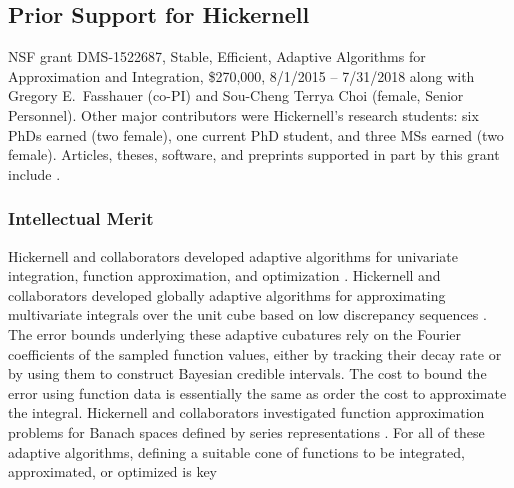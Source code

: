 \documentclass[11pt]{NSFamsart}
\begin{document}
\subsection*{Prior Support for Hickernell} NSF grant DMS-1522687, Stable, Efficient, Adaptive Algorithms for Approximation and Integration,
		\$270,000, 8/1/2015 -- 7/31/2018 along with Gregory E.\ Fasshauer (co-PI) and  Sou-Cheng Terrya Choi (female, Senior Personnel).  Other major contributors were Hickernell's research students: 
		six PhDs earned (two female), one current PhD student, and three MSs earned (two female).
Articles, theses, software, and preprints supported in
part by this grant include
\cite{ala_augmented_2017,
	ChoEtal17a,
	ChoEtal20a,
	Din15a,
	DinHic20a,
	GilEtal16a,
	Hic17a,
	HicJag18b,
	HicJim16a,
	HicEtal18a,
	HicEtal17a,
	HicKriWoz19a,
	RatHic19a,
	GilJim16b,
	JimHic16a,
	JohFasHic18a,
	Li16a,
	Liu17a,
	MarEtal18a,
	mccourt_stable_2017,
	MCCEtal19a,
	mishra_hybrid_2018,
	MisEtal19a,
	rashidinia_stable_2016,
	rashidinia_stable_2018,
	Zha18a,
	Zha17a,
	Zho15a,
	ZhoHic15a}.

\subsubsection*{Intellectual Merit}
Hickernell and collaborators developed adaptive algorithms for univariate integration, function approximation, and optimization \cite{ChoEtal17a,HicEtal14b, Din15a, Ton14a, Zha18a}.
Hickernell and collaborators developed globally adaptive algorithms for approximating multivariate integrals over the unit cube based on low discrepancy sequences \cite{HicJim16a,HicEtal17a,JimHic16a,RatHic19a}.  The error bounds underlying these adaptive cubatures rely on the Fourier coefficients of the sampled function values, either by tracking their decay rate or by using them to construct Bayesian credible intervals. The cost to bound the error using function data is essentially the same as order the cost to approximate the integral. 
Hickernell and collaborators investigated function approximation problems for Banach spaces defined by series representations \cite{DinHic20a,DinEtal20a}.  For all of these adaptive algorithms, defining a suitable cone of functions to be integrated, approximated, or optimized is key
\end{document}
